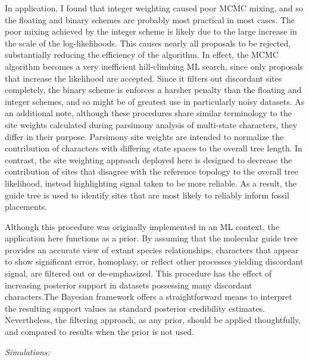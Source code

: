 \documentclass[12pt]{article}
\begin{document}
In application, I found that integer weighting caused poor MCMC mixing,
and so the floating and binary schemes are probably most practical in
most cases. The poor mixing achieved by the integer scheme is likely due to the large increase in the scale of the log-likelihoods. 
This causes nearly all proposals to be rejected, substantially reducing the efficiency of the algorithm. In effect,
the MCMC algorithm becomes a very inefficient hill-climbing ML search, since only proposals that increase the likelihood are accepted.
 Since it filters out discordant sites completely, the binary
scheme is enforces a harsher penalty than the floating and integer
schemes, and so might be of greatest use in particularly noisy datasets.
As an additional note, although these procedures share similar
terminology to the site weights calculated during parsimony analysis of
multi-state characters, they differ in their purpose. Parsimony site
weights are intended to normalize the contribution of characters with
differing state spaces to the overall tree length. In contrast, the site
weighting approach deployed here is designed to decrease the
contribution of sites that disagree with the reference topology to the
overall tree likelihood, instead highlighting signal taken to be
more reliable. As a result, the guide tree is used to identify sites
that are most likely to reliably inform fossil placements.

Although this procedure was originally implemented in an ML context, the application here 
functions  as a prior. By assuming that the molecular guide tree provides an accurate view of 
extant species relationships, characters that appear to show significant error, homoplasy, or 
reflect other processes yielding discordant signal, are filtered out or de-emphasized. This 
procedure has the effect of increasing posterior support in datasets possessing many discordant
characters.The Bayesian framework offers a straightforward means to interpret the resulting 
support values as standard posterior credibility estimates. Nevertheless, the filtering approach,
as any prior, should be applied thoughtfully, and compared to results when the prior is not used.

\noindent\emph{Simulations:}
\end{document}

